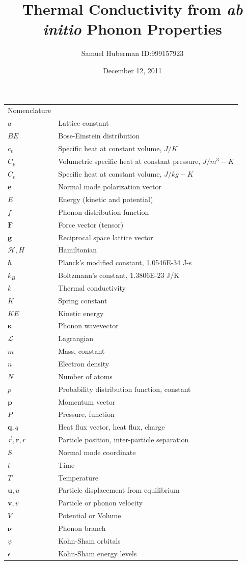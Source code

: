 \documentclass{article}
\title{Thermal Conductivity from \textit{ab initio} Phonon Properties}
\date{December 12, 2011}
\author{Samuel Huberman ID:999157923}
\numberwithin{equation}{section}
\begin{document}
\maketitle
\newpage
\begin{spacing}{1.0}
\begin{tabular}{ l l }
  Nomenclature\\
  $a$ & Lattice constant \\
  $BE$ & Bose-Einstein distribution \\
  $c_v$ & Specific heat at constant volume, $J/K$\\
  $C_p$ & Volumetric specific heat at constant pressure, $J/m^3-K$\\
  $C_v$ & Specific heat at constant volume, $J/kg-K$\\
  $\textbf{e}$ & Normal mode polarization vector\\
  $E$ & Energy (kinetic and potential)\\
  $f$ & Phonon distribution function\\
  $\textbf{F}$ & Force vector (tensor)\\
  $\textbf{g}$ & Reciprocal space lattice vector\\
  $\mathscr{H}, H$ & Hamiltonian \\
  $\hbar$ & Planck's modified constant, 1.0546E-34 J-s\\
  $k_B$ & Boltzmann's constant, 1.3806E-23 J/K\\
  $k$ & Thermal conductivity\\
  $K$ & Spring constant\\
  $KE$ & Kinetic energy\\
  $\pmb{\kappa}$ & Phonon wavevector\\ 
  $\mathscr{L}$ & Lagrangian \\
  $m$ & Mass, constant\\
  $n$ & Electron density\\
  $N$ & Number of atoms\\
  $p$ & Probability distribution function, constant\\
  $\textbf{p}$ & Momentum vector\\
  $P$ & Pressure, function\\
  $\textbf{q},q$ & Heat flux vector, heat flux, charge\\
  $\vec{r},\textbf{r},r$ & Particle position, inter-particle separation\\
  $S$ & Normal mode coordinate\\
  $t$ & Time\\
  $T$ & Temperature\\
  $\textbf{u},u$ & Particle displacement from equilibrium\\
  $\textbf{v},v$ & Particle or phonon velocity\\
  $V$ & Potential or Volume\\
  $\pmb{\nu}$ & Phonon branch\\
  $\psi$ & Kohn-Sham orbitals\\
  $\epsilon$ & Kohn-Sham energy levels\\
\end{tabular}
\end{spacing}
\newpage
\end{document}
